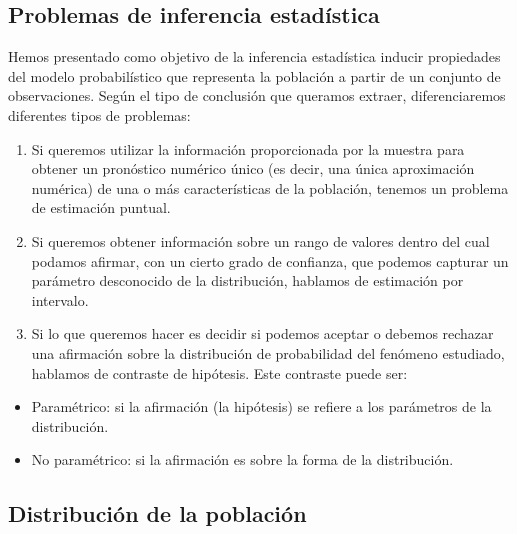 \documentclass[
]{article}
\providecommand{\tightlist}{%
  \setlength{\itemsep}{0pt}\setlength{\parskip}{0pt}}
\begin{document}
\subsection{Problemas de inferencia estadística}\label{problemas-de-inferencia-estaduxedstica}

Hemos presentado como objetivo de la inferencia estadística inducir propiedades del modelo probabilístico que representa la población a partir de un conjunto de observaciones.
Según el tipo de conclusión que queramos extraer, diferenciaremos diferentes tipos de problemas:

\begin{enumerate}
\def\labelenumi{\arabic{enumi}.}
\tightlist
\item
  Si queremos utilizar la información proporcionada por la muestra para obtener un pronóstico numérico único (es decir, una única aproximación numérica) de una o más características de la población, tenemos un problema de estimación puntual.
\item
  Si queremos obtener información sobre un rango de valores dentro del cual podamos afirmar, con un cierto grado de confianza, que podemos capturar un parámetro desconocido de la distribución, hablamos de estimación por intervalo.
\item
  Si lo que queremos hacer es decidir si podemos aceptar o debemos rechazar una afirmación sobre la distribución de probabilidad del fenómeno estudiado, hablamos de contraste de hipótesis. Este contraste puede ser:
\end{enumerate}

\begin{itemize}
\tightlist
\item
  Paramétrico: si la afirmación (la hipótesis) se refiere a los parámetros de la distribución.
\item
  No paramétrico: si la afirmación es sobre la forma de la distribución.
\end{itemize}

\subsection{Distribución de la población}\label{distribuciuxf3n-de-la-poblaciuxf3n}
\end{document}
